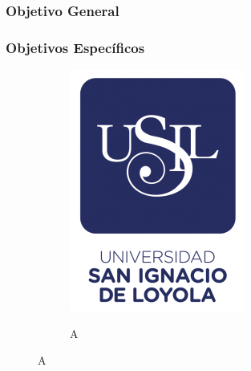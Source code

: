 \subsubsection{Objetivo General}

\lipsum[8]

\subsubsection{Objetivos Específicos}

\lipsum[9]

\begin{figure}
  \caption{Figura con subfiguras}
  \label{fig:figura}
  \begin{subfigure}{0.4\textwidth}
      \centering
      \caption{A}
      \includegraphics[width=\linewidth]{E_IMAGENES/0_Caratula/USIL LOGO.png}
      \label{fig:subfig1}
  \end{subfigure}

\end{figure}
